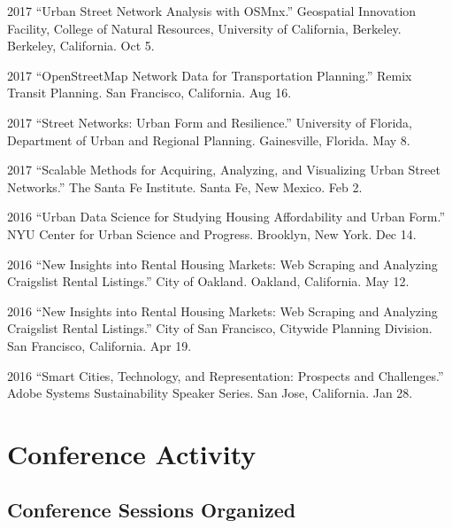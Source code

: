 \documentclass{academiccv}
\begin{document}
\begin{tablist}
\item[2017] \tab \enquote{Urban Street Network Analysis with OSMnx.} Geospatial Innovation Facility, College of Natural Resources, University of California, Berkeley. Berkeley, California. Oct 5.

\item[2017] \tab \enquote{OpenStreetMap Network Data for Transportation Planning.} Remix Transit Planning. San Francisco, California. Aug 16.

\item[2017] \tab \enquote{Street Networks: Urban Form and Resilience.} University of Florida, Department of Urban and Regional Planning. Gainesville, Florida. May 8.

\item[2017] \tab \enquote{Scalable Methods for Acquiring, Analyzing, and Visualizing Urban Street Networks.} The Santa Fe Institute. Santa Fe, New Mexico. Feb 2.

\item[2016] \tab \enquote{Urban Data Science for Studying Housing Affordability and Urban Form.} NYU Center for Urban Science and Progress. Brooklyn, New York. Dec 14.

\item[2016] \tab \enquote{New Insights into Rental Housing Markets: Web Scraping and Analyzing Craigslist Rental Listings.} City of Oakland. Oakland, California. May 12.

\item[2016] \tab \enquote{New Insights into Rental Housing Markets: Web Scraping and Analyzing Craigslist Rental Listings.} City of San Francisco, Citywide Planning Division. San Francisco, California. Apr 19.

\item[2016] \tab \enquote{Smart Cities, Technology, and Representation: Prospects and Challenges.} Adobe Systems Sustainability Speaker Series. San Jose, California. Jan 28.

\end{tablist}



\section*{Conference Activity}

\subsection*{Conference Sessions Organized}
\end{document}
